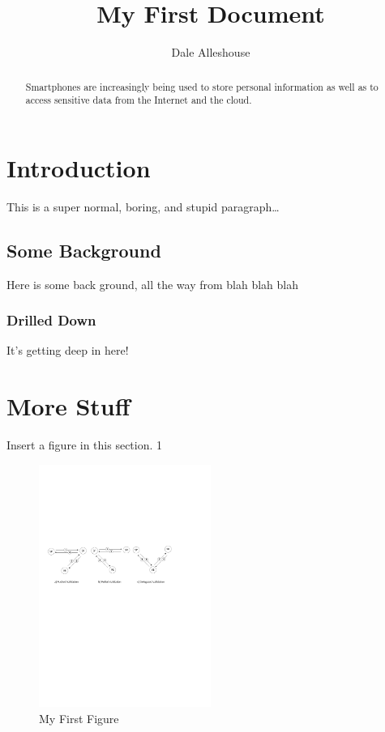 \documentclass{article}
\title{My First Document} \author{Dale Alleshouse}
\begin{document}
 \maketitle

\begin{abstract}
    Smartphones are increasingly being used to store personal
    information as well as to access sensitive data from the Internet and the
    cloud.
\end{abstract}

\section{Introduction} This is a super normal, boring, and stupid
paragraph\ldots

\subsection{Some Background} Here is some back ground, all the way from blah
blah blah

\subsubsection{Drilled Down}\label{sec:drilled-down} It's getting deep in here!

\newpage
\section{More Stuff}

Insert a figure in this section. 1

\begin{figure}
    \centering
    \includegraphics[width=0.5\textwidth]{att-models-base.pdf}
    \caption{My First Figure}\label{fig:first-figure}
\end{figure}
\end{document}
